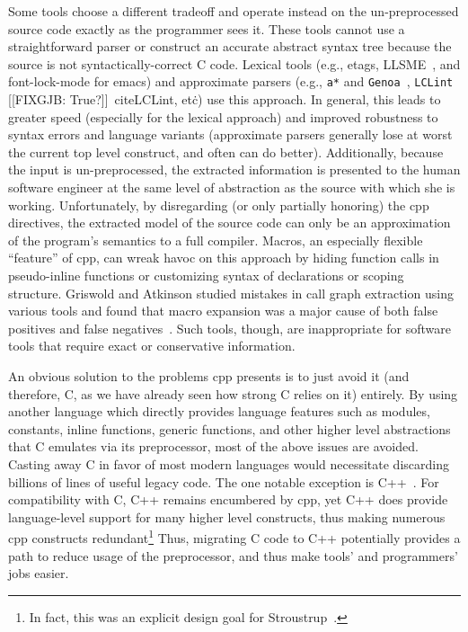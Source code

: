 \documentclass{article}
\newcommand{\Cpp}{\mbox{\textsf{cpp}}}
\newcommand{\CPP}{\mbox{\textsf{C++}}}
\newcommand{\C}{\mbox{\textsf{C}}}
\newcommand{\eg}{e.g.,}
\newcommand{\etc}{etc\.}
\begin{document}
Some tools choose a different tradeoff and operate instead on the
un-preprocessed source code exactly as the programmer sees it.  These
tools cannot use a straightforward parser or construct an accurate
abstract syntax tree because the source is not syntactically-correct
\C{} code.  Lexical tools (\eg{} etags, LLSME~\cite{Murphy95}, and
font-lock-mode for emacs) and approximate parsers (\eg{} \texttt{a*} and
\texttt{Genoa}~\cite{Griswold96}, \texttt{LCLint} [[FIXGJB:
True?]]~cite{LCLint}, \etc{}) use this approach.  In general, this leads
to greater speed (especially for the lexical approach) and improved
robustness to syntax errors and language variants (approximate parsers
generally lose at worst the current top level construct, and often can
do better). Additionally, because the input is un-preprocessed, the
extracted information is presented to the human software engineer at the
same level of abstraction as the source with which she is working.
Unfortunately, by disregarding (or only partially honoring) the \Cpp{}
directives, the extracted model of the source code can only be an
approximation of the program's semantics to a full compiler.  Macros, an
especially flexible ``feature'' of \Cpp{}, can wreak havoc on this
approach by hiding function calls in pseudo-inline functions or
customizing syntax of declarations or scoping structure.  Griswold and
Atkinson studied mistakes in call graph extraction using various tools
and found that macro expansion was a major cause of both false positives
and false negatives~\cite{Griswold96}.  Such tools, though, are
inappropriate for software tools that require exact or conservative
information.

An obvious solution to the problems \Cpp{} presents is to just avoid it
(and therefore, \C{}, as we have already seen how strong \C{} relies on
it) entirely.  By using another language which directly provides
language features such as modules, constants, inline functions, generic
functions, and other higher level abstractions that \C{} emulates via
its preprocessor, most of the above issues are avoided.  Casting away
\C{} in favor of most modern languages would necessitate discarding
billions of lines of useful legacy code.  The one notable exception is
\CPP{}~\cite{CD2DraftStandard}. For compatibility with \C{}, \CPP{}
remains encumbered by \Cpp{}, yet \CPP{} does provide language-level
support for many higher level constructs, thus making numerous \Cpp{}
constructs redundant\footnote{In fact, this was an explicit design goal
  for Stroustrup~\cite[p.~424]{Stroustrup94}.}  Thus, migrating \C{}
code to \CPP{} potentially provides a path to reduce usage of the
preprocessor, and thus make tools' and programmers' jobs easier.
\end{document}
